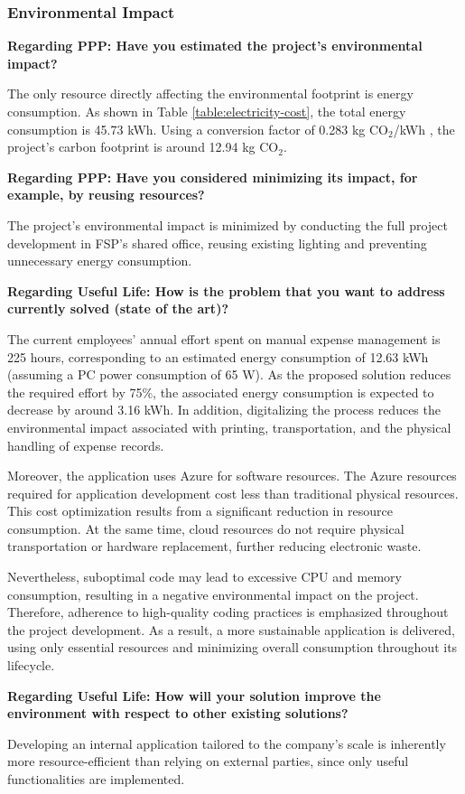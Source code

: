 
\subsubsection{Environmental Impact}


\textbf{Regarding PPP: Have you estimated the project's environmental impact? }
\vspace{-5pt}

The only resource directly affecting the environmental footprint is energy consumption. As shown in Table \ref{table:electricity-cost}, the total energy consumption is 45.73 kWh. Using a conversion factor of 0.283 kg CO$_2$/kWh \cite{electricity-carbon}, the project's carbon footprint is around 12.94 kg CO$_2$.  


\textbf{Regarding PPP: Have you considered minimizing its impact, for example, by reusing resources? }
\vspace{-5pt}

The project's environmental impact is minimized by conducting the full project development in FSP's shared office, reusing existing lighting and preventing unnecessary energy consumption. 


\textbf{Regarding Useful Life: How is the problem that you want to address currently solved (state of the art)?}
\vspace{-5pt}

The current employees' annual effort spent on manual expense management is 225 hours, corresponding to an estimated energy consumption of 12.63 kWh (assuming a PC power consumption of 65 W). As the proposed solution reduces the required effort by 75\%, the associated energy consumption is expected to decrease by around 3.16 kWh. In addition, digitalizing the process reduces the environmental impact associated with printing, transportation, and the physical handling of expense records.

Moreover, the application uses Azure for software resources. The Azure resources required for application development cost less than traditional physical resources. This cost optimization results from a significant reduction in resource consumption. At the same time, cloud resources do not require physical transportation or hardware replacement, further reducing electronic waste. 

Nevertheless, suboptimal code may lead to excessive CPU and memory consumption, resulting in a negative environmental impact on the project. Therefore, adherence to high-quality coding practices is emphasized throughout the project development. As a result, a more sustainable application is delivered, using only essential resources and minimizing overall consumption throughout its lifecycle.



\textbf{Regarding Useful Life: How will your solution improve the environment with respect to other existing solutions? }
\vspace{-5pt}

Developing an internal application tailored to the company’s scale is inherently more resource-efficient than relying on external parties, since only useful functionalities are implemented. 
